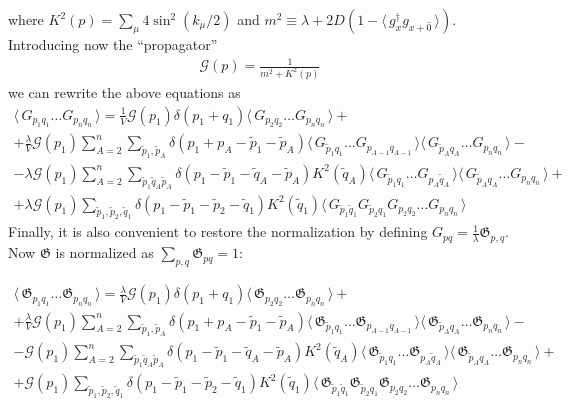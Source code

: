 \documentclass[twocolumn,showpacs,preprintnumbers,superscriptaddress,amsmath,floatfix,amssymb,secnumarabic]{revtex4}
\newcommand{\CG}{\mathfrak{G}}
\newcommand{\lr}[1]{ \left( #1 \right) }
\newcommand{\vev}[1]{ \langle \, #1 \, \rangle }
\begin{document}
\begin{widetext}
where $K^2\lr{p} = \sum\limits_{\mu} 4 \sin^2\lr{k_{\mu}/2}$ and $m^2 \equiv \lambda + 2 D\lr{1 - \vev{g^{\dag}_x g_{x + \hat{0}}}}$. Introducing now the ``propagator''
\begin{eqnarray}
\label{propagator_def}
 \mathcal{G}\lr{p} = \frac{1}{m^2 + K^2\lr{p}}
\end{eqnarray}
we can rewrite the above equations as
\begin{eqnarray}
\label{sd_G_general_kappa_momentum}
 \vev{ G_{p_1 q_1} \ldots G_{p_n q_n} }
 =
  \frac{1}{V} \mathcal{G}\lr{p_1} \delta\lr{p_1 + q_1} \vev{G_{p_2 q_2} \ldots G_{p_n q_n}}
 + \nonumber \\ +
 \frac{\lambda}{V} \mathcal{G}\lr{p_1} \sum\limits_{A=2}^{n} \sum\limits_{\tilde{p}_1, \tilde{p}_A} \delta\lr{p_1 + p_A - \tilde{p}_1 - \tilde{p}_A} \vev{G_{\tilde{p}_1 q_1} \ldots G_{p_{A-1} q_{A-1}}} \vev{G_{\tilde{p}_A q_A} \ldots G_{p_n q_n}}
 - \nonumber \\ -
 \lambda \mathcal{G}\lr{p_1} \sum\limits_{A=2}^{n}
 \sum\limits_{\tilde{p}_1 \tilde{q}_A \tilde{p}_A}
 \delta\lr{p_1 - \tilde{p}_1 - \tilde{q}_A - \tilde{p}_A}
 K^2\lr{\tilde{q}_A}
 \vev{G_{\tilde{p}_1 q_1} \ldots G_{p_{A} \tilde{q}_A}} \vev{G_{\tilde{p}_A q_A} \ldots G_{p_n q_n}}
 + \nonumber \\ +
 \lambda \mathcal{G}\lr{p_1} \sum\limits_{\tilde{p}_1, \tilde{p}_2, \tilde{q}_1}
 \delta\lr{p_1 - \tilde{p}_1 - \tilde{p}_2 - \tilde{q}_1} K^2\lr{\tilde{q}_1} \vev{G_{\tilde{p}_1 \tilde{q}_1} G_{\tilde{p}_2 q_1} G_{p_2 q_2} \ldots G_{p_n q_n}}
\end{eqnarray}
Finally, it is also convenient to restore the normalization by defining $G_{pq} = \frac{1}{\lambda} \CG_{p,q}$. Now $\CG$ is normalized as $\sum\limits_{p,q} \CG_{pq} = 1$:

\begin{eqnarray}
\label{sd_G_general_rescaled}
 \vev{ \CG_{p_1 q_1} \ldots \CG_{p_n q_n} }
 =
  \frac{\lambda}{V} \mathcal{G}\lr{p_1} \delta\lr{p_1 + q_1} \vev{\CG_{p_2 q_2} \ldots \CG_{p_n q_n}}
 + \nonumber \\ +
 \frac{\lambda}{V} \mathcal{G}\lr{p_1} \sum\limits_{A=2}^{n} \sum\limits_{\tilde{p}_1, \tilde{p}_A} \delta\lr{p_1 + p_A - \tilde{p}_1 - \tilde{p}_A} \vev{\CG_{\tilde{p}_1 q_1} \ldots \CG_{p_{A-1} q_{A-1}}} \vev{\CG_{\tilde{p}_A q_A} \ldots \CG_{p_n q_n}}
 - \nonumber \\ -
 \mathcal{G}\lr{p_1} \sum\limits_{A=2}^{n}
 \sum\limits_{\tilde{p}_1 \tilde{q}_A \tilde{p}_A}
 \delta\lr{p_1 - \tilde{p}_1 - \tilde{q}_A - \tilde{p}_A}
 K^2\lr{\tilde{q}_A}
 \vev{\CG_{\tilde{p}_1 q_1} \ldots \CG_{p_{A} \tilde{q}_A}} \vev{\CG_{\tilde{p}_A q_A} \ldots \CG_{p_n q_n}}
 + \nonumber \\ +
 \mathcal{G}\lr{p_1} \sum\limits_{\tilde{p}_1, \tilde{p}_2, \tilde{q}_1}
 \delta\lr{p_1 - \tilde{p}_1 - \tilde{p}_2 - \tilde{q}_1} K^2\lr{\tilde{q}_1} \vev{\CG_{\tilde{p}_1 \tilde{q}_1} \CG_{\tilde{p}_2 q_1} \CG_{p_2 q_2} \ldots \CG_{p_n q_n}}
\end{eqnarray}

\end{widetext}
\end{document}
